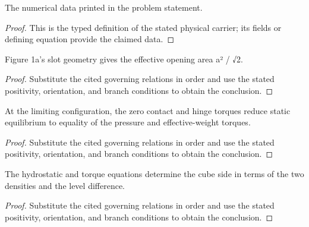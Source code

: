\begin{definition}
  \label{def:physics:IPhO_2026_1_A_1:aux017}
  The numerical data printed in the problem statement.
\end{definition}
\begin{proof}
  This is the typed definition of the stated physical carrier; its fields or defining equation provide the claimed data.
\end{proof}

\begin{lemma}
  \label{lem:physics:IPhO_2026_1_A_1:aux018}
  Figure 1a's slot geometry gives the effective opening area a² / √2.
\end{lemma}
\begin{proof}
  Substitute the cited governing relations in order and use the stated positivity, orientation, and branch conditions to obtain the conclusion.
\end{proof}

\begin{lemma}
  \label{lem:physics:IPhO_2026_1_A_1:aux019}
  At the limiting configuration, the zero contact and hinge torques reduce static equilibrium to equality of the pressure and effective-weight torques.
\end{lemma}
\begin{proof}
  Substitute the cited governing relations in order and use the stated positivity, orientation, and branch conditions to obtain the conclusion.
\end{proof}

\begin{lemma}
  \label{lem:physics:IPhO_2026_1_A_1:aux020}
  The hydrostatic and torque equations determine the cube side in terms of the two densities and the level difference.
\end{lemma}
\begin{proof}
  Substitute the cited governing relations in order and use the stated positivity, orientation, and branch conditions to obtain the conclusion.
\end{proof}

